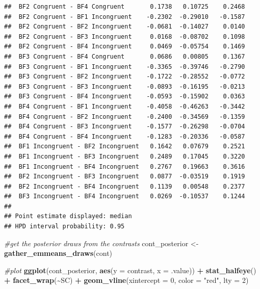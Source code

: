 \documentclass[
]{article}
\newenvironment{Shaded}{\begin{snugshade}}{\end{snugshade}}
\newcommand{\AttributeTok}[1]{\textcolor[rgb]{0.13,0.29,0.53}{#1}}
\newcommand{\CommentTok}[1]{\textcolor[rgb]{0.56,0.35,0.01}{\textit{#1}}}
\newcommand{\DecValTok}[1]{\textcolor[rgb]{0.00,0.00,0.81}{#1}}
\newcommand{\FunctionTok}[1]{\textcolor[rgb]{0.13,0.29,0.53}{\textbf{#1}}}
\newcommand{\NormalTok}[1]{#1}
\newcommand{\OtherTok}[1]{\textcolor[rgb]{0.56,0.35,0.01}{#1}}
\newcommand{\SpecialCharTok}[1]{\textcolor[rgb]{0.81,0.36,0.00}{\textbf{#1}}}
\newcommand{\StringTok}[1]{\textcolor[rgb]{0.31,0.60,0.02}{#1}}
\begin{document}
\begin{verbatim}
##  BF2 Congruent - BF4 Congruent       0.1738   0.10725    0.2468
##  BF2 Congruent - BF1 Incongruent    -0.2302  -0.29010   -0.1587
##  BF2 Congruent - BF2 Incongruent    -0.0681  -0.14027    0.0140
##  BF2 Congruent - BF3 Incongruent     0.0168  -0.08702    0.1098
##  BF2 Congruent - BF4 Incongruent     0.0469  -0.05754    0.1469
##  BF3 Congruent - BF4 Congruent       0.0686   0.00805    0.1367
##  BF3 Congruent - BF1 Incongruent    -0.3365  -0.39746   -0.2790
##  BF3 Congruent - BF2 Incongruent    -0.1722  -0.28552   -0.0772
##  BF3 Congruent - BF3 Incongruent    -0.0893  -0.16195   -0.0213
##  BF3 Congruent - BF4 Incongruent    -0.0593  -0.15902    0.0363
##  BF4 Congruent - BF1 Incongruent    -0.4058  -0.46263   -0.3442
##  BF4 Congruent - BF2 Incongruent    -0.2400  -0.34569   -0.1359
##  BF4 Congruent - BF3 Incongruent    -0.1577  -0.26298   -0.0704
##  BF4 Congruent - BF4 Incongruent    -0.1283  -0.20336   -0.0587
##  BF1 Incongruent - BF2 Incongruent   0.1642   0.07679    0.2521
##  BF1 Incongruent - BF3 Incongruent   0.2489   0.17045    0.3220
##  BF1 Incongruent - BF4 Incongruent   0.2767   0.19663    0.3616
##  BF2 Incongruent - BF3 Incongruent   0.0877  -0.03519    0.1919
##  BF2 Incongruent - BF4 Incongruent   0.1139   0.00548    0.2377
##  BF3 Incongruent - BF4 Incongruent   0.0269  -0.10537    0.1244
## 
## Point estimate displayed: median 
## HPD interval probability: 0.95
\end{verbatim}

\begin{Shaded}
\begin{Highlighting}[]
\CommentTok{\#get the posterior draws from the contrasts}
\NormalTok{cont\_posterior }\OtherTok{\textless{}{-}} \FunctionTok{gather\_emmeans\_draws}\NormalTok{(cont)}

\CommentTok{\#plot}
\FunctionTok{ggplot}\NormalTok{(cont\_posterior,}
       \FunctionTok{aes}\NormalTok{(}\AttributeTok{y =}\NormalTok{ contrast, }\AttributeTok{x =}\NormalTok{ .value)) }\SpecialCharTok{+}
  \FunctionTok{stat\_halfeye}\NormalTok{() }\SpecialCharTok{+}
  \FunctionTok{facet\_wrap}\NormalTok{(}\SpecialCharTok{\textasciitilde{}}\NormalTok{SC) }\SpecialCharTok{+}
  \FunctionTok{geom\_vline}\NormalTok{(}\AttributeTok{xintercept =} \DecValTok{0}\NormalTok{, }\AttributeTok{color =} \StringTok{"red"}\NormalTok{, }\AttributeTok{lty =} \DecValTok{2}\NormalTok{)}
\end{Highlighting}
\end{Shaded}
\end{document}
